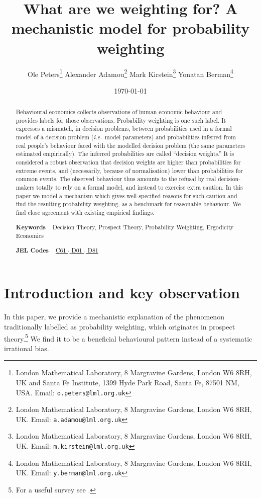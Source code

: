 \documentclass[a4paper, 12pt]{article}
\title{What are we weighting for? A mechanistic model for probability weighting}
\author{
Ole Peters\footnote{London Mathematical Laboratory, 8 Margravine Gardens, London W6 8RH, UK and Santa Fe Institute, 1399 Hyde Park Road, Santa Fe, 87501 NM, USA. Email: \texttt{o.peters@lml.org.uk}} \;
Alexander Adamou\footnote{London Mathematical Laboratory, 8 Margravine Gardens, London W6 8RH, UK. Email: \texttt{a.adamou@lml.org.uk}} \;
Mark Kirstein\footnote{London Mathematical Laboratory, 8 Margravine Gardens, London W6 8RH, UK. Email: \texttt{m.kirstein@lml.org.uk}} \;
Yonatan Berman\footnote{London Mathematical Laboratory, 8 Margravine Gardens, London W6 8RH, UK. Email: \texttt{y.berman@lml.org.uk}} 
}
\date{\today}
\newcommand{\ie}{{\it i.e.}\ }
\begin{document}
\begin{titlepage}
	\maketitle
\thispagestyle{fancy}

\begin{abstract}
\noindent 
Behavioural economics collects observations of human economic behaviour and provides labels for those observations. 
Probability weighting is one such label. It expresses a mismatch, in decision problems, between probabilities used in a formal model of a decision problem (\ie model parameters) and probabilities inferred from real people's behaviour faced with the modelled decision problem (the same parameters estimated empirically). The inferred probabilities are called ``decision weights.'' 
It is considered a robust observation that decision weights are higher than probabilities for extreme events, and (necessarily, because of normalisation) lower than probabilities for common events.
The observed behaviour thus amounts to the refusal by real decision-makers totally to rely on a formal model, and instead to exercise extra caution. In this paper we model a mechanism which gives well-specified reasons for such caution and find the resulting probability weighting, as a benchmark for reasonable behaviour.
We find close agreement with existing empirical findings.

\vspace{1em}

\noindent\textsf{\textbf{Keywords}} ~ Decision Theory, Prospect Theory, Probability Weighting, Ergodicity Economics
\vspace{.5em}

\noindent\textsf{\textbf{JEL Codes}} ~
\href{https://www.aeaweb.org/econlit/jelCodes.php?view=jel#C}{%
C61		%
$\cdot$
}%
\href{https://www.aeaweb.org/econlit/jelCodes.php?view=jel#D}{%
D01 	%
$\cdot$
D81 	%
}
\end{abstract}
\end{titlepage}

\section{Introduction and key observation}
In this paper, we provide a mechanistic explanation of the phenomenon traditionally labelled as probability weighting, which originates in prospect theory.\footnote{\cite{TverskyKahneman1992} For a useful survey see \cite{Barberis2013}.} We find it to be a beneficial behavioural pattern instead of a systematic irrational bias. 
 
\end{document}
